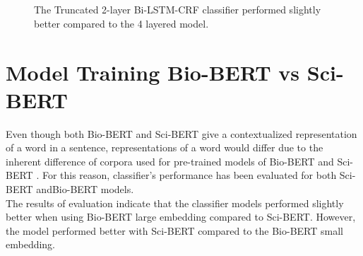 \begin{figure}[h]
	
	\myfloatalign
	
	 \\
	\\
	\caption[Subfloat - Figure]{The Truncated 2-layer \ac{Bi-LSTM-CRF} classifier performed slightly better compared to the 4 layered model.}
\end{figure}


\section{Model Training Bio-BERT vs Sci-BERT}
\label{sec:chapter06:biosci}

Even though both \ac{Bio-BERT} and \ac{Sci-BERT} give a contextualized representation of a word in a sentence, representations of a word would differ due to the inherent difference of corpora used for pre-trained models of \ac{Bio-BERT} and \ac{Sci-BERT} \citep{beltagy2019scibert,li2019fine}. For this reason, classifier’s performance has been evaluated for both \ac{Sci-BERT} and\ac{Bio-BERT} models. \\

The results of evaluation indicate that the classifier models performed slightly better when using \ac{Bio-BERT} large embedding compared to \ac{Sci-BERT}. However, the model performed better with \ac{Sci-BERT} compared to the \ac{Bio-BERT} small embedding. 

